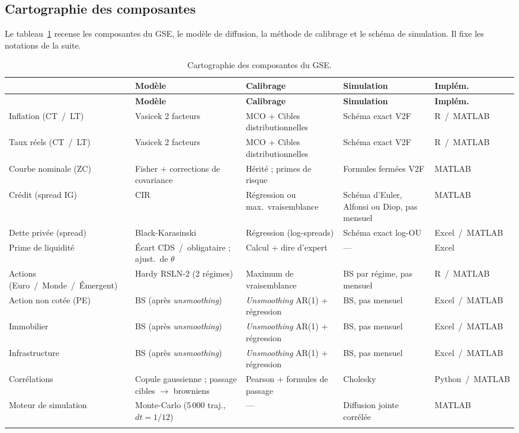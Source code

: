 \documentclass[11pt,a4paper]{article}
\newcommand{\tablehead}[1]{{\sffamily\bfseries\color{nxnavy}#1}}
\begin{document}
% 

\subsection{Cartographie des composantes}
Le tableau~\ref{tab:carto} recense les composantes du GSE, le modèle de diffusion, la méthode de calibrage et le schéma de simulation. Il fixe les notations de la suite.

\begingroup\small\setlength{\tabcolsep}{4pt}\renewcommand{\arraystretch}{1.2}
\begin{longtable}{>{\raggedright\arraybackslash}p{2.6cm}>{\raggedright\arraybackslash}p{2.8cm}>{\raggedright\arraybackslash}p{2.7cm}>{\raggedright\arraybackslash}p{2.8cm}>{\raggedright\arraybackslash}p{2.1cm}}
\toprule
\tablehead{Composante} & \tablehead{Modèle} & \tablehead{Calibrage} & \tablehead{Simulation} & \tablehead{Implém.} \\
\midrule
\endfirsthead
\toprule
\tablehead{Composante} & \tablehead{Modèle} & \tablehead{Calibrage} & \tablehead{Simulation} & \tablehead{Implém.} \\
\midrule
\endhead
\bottomrule
\endfoot
\rowcolor{nxlightblue} Inflation (CT~/~LT) & Vasicek 2 facteurs & MCO + Cibles distributionnelles & Schéma exact V2F & R~/~MATLAB \\
Taux réels (CT~/~LT) & Vasicek 2 facteurs & MCO + Cibles distributionnelles & Schéma exact V2F & R~/~MATLAB \\
\rowcolor{nxlightblue} Courbe nominale (ZC) & Fisher + corrections de covariance & Hérité ; primes de risque & Formules fermées V2F & MATLAB \\
Crédit (spread IG) & CIR & Régression ou max.\ vraisemblance & Schéma d'Euler, Alfonsi ou Diop, pas mensuel & MATLAB \\
\rowcolor{nxlightblue} Dette privée (spread) & Black-Karasinski & Régression (log-spreads) & Schéma exact log-OU & Excel~/~MATLAB \\
Prime de liquidité & Écart CDS~/~obligataire ; ajust.\ de $\theta$ & Calcul + dire d'expert & --- & Excel \\
\rowcolor{nxlightblue} Actions (Euro~/~Monde~/~Émergent) & Hardy RSLN-2 (2 régimes) & Maximum de vraisemblance & BS par régime, pas mensuel & R~/~MATLAB \\
Action non cotée (PE) & BS (après \emph{unsmoothing}) & \emph{Unsmoothing} AR(1) + régression & BS, pas mensuel & Excel~/~MATLAB \\
\rowcolor{nxlightblue} Immobilier & BS (après \emph{unsmoothing}) & \emph{Unsmoothing} AR(1) + régression & BS, pas mensuel & Excel~/~MATLAB \\
Infrastructure & BS (après \emph{unsmoothing}) & \emph{Unsmoothing} AR(1) + régression & BS, pas mensuel & Excel~/~MATLAB \\
\rowcolor{nxlightblue} Corrélations & Copule gaussienne ; passage cibles $\to$ browniens & Pearson + formules de passage & Cholesky & Python~/~MATLAB \\
Moteur de simulation & Monte-Carlo (5\,000 traj., $dt=1/12$) & --- & Diffusion jointe corrélée & MATLAB \\
\caption{Cartographie des composantes du GSE.}
\label{tab:carto}
\end{longtable}
\endgroup
\end{document}

